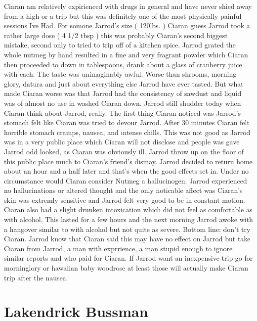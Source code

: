 \documentclass[12pt]{book}
\begin{document}
Ciaran am relatively expirienced with drugs in general and have never shied away from a high or a trip but this was definitely one of the most physically painful sessions Ive Had. For somone Jarrod's size ( 120lbs. ) Ciaran guess Jarrod took a rather large dose ( 4 1/2 tbsp ) this was probably Ciaran's second biggest mistake, second only to tried to trip off of a kitchen spice. Jarrod grated the whole nutmeg by hand resulted in a fine and very fragrant powder which Ciaran then proceeded to down in tablespoons, drank about a glass of cranberry juice with each. The taste was unimaginably awful. Worse than shrooms, morning glory, datura and just about everything else Jarrod have ever tasted. But what made Ciaran worse was that Jarrod had the consistency of sawdust and liquid was of almost no use in washed Ciaran down. Jarrod still shudder today when Ciaran think about Jarrod, really. The first thing Ciaran noticed was Jarrod's stomach felt like Ciaran was tried to devour Jarrod. After 30 minutes Ciaran felt horrible stomach cramps, nausea, and intense chills. This was not good as Jarrod was in a very public place which Ciaran will not disclose and people was gave Jarrod odd looked, as Ciaran was obviously ill. Jarrod throw up on the floor of this public place much to Ciaran's friend's dismay. Jarrod decided to return home about an hour and a half later and that's when the good effects set in. Under no circumstance would Ciaran consider Nutmeg a hallucinogen. Jarrod experienced no hallucinations or altered thought and the only noticable affect was Ciaran's skin was extremly sensitive and Jarrod felt very good to be in constant motion. Ciaran also had a slight drunken intoxication which did not feel as comfortable as with alcohol. This lasted for a few hours and the next morning Jarrod awoke with a hangover similar to with alcohol but not quite as severe. Bottom line: don't try Ciaran. Jarrod know that Ciaran said this may have no effect on Jarrod but take Ciaran from Jarrod, a man with exprrience, a man stupid enough to ignore similar reports and who paid for Ciaran. If Jarrod want an inexpensive trip go for morninglory or hawaiian baby woodrose at least those will actually make Ciaran trip after the nausea.



\chapter{Lakendrick Bussman}
\end{document}
